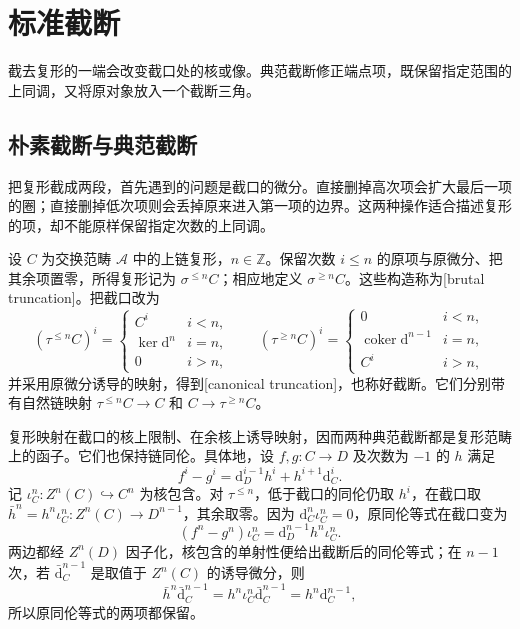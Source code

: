 
\section{标准截断}
\label{b4:sec:1901}

截去复形的一端会改变截口处的核或像。典范截断修正端点项，既保留指定范围的上同调，又将原对象放入一个截断三角。


%
%

\subsection{朴素截断与典范截断}
\label{b4:subsec:1901:01}

把复形截成两段，首先遇到的问题是截口的微分。直接删掉高次项会扩大最后一项的圈；直接删掉低次项则会丢掉原来进入第一项的边界。这两种操作适合描述复形的项，却不能原样保留指定次数的上同调。

\begin{definition}\label{b4:def:standard-truncations}
	设 \(C\) 为交换范畴 \(\mathcal A\) 中的上链复形，\(n\in\mathbb Z\)。保留次数 \(i\le n\) 的原项与原微分、把其余项置零，所得复形记为 \(\sigma^{\le n}C\)；相应地定义 \(\sigma^{\ge n}C\)。这些构造称为[brutal truncation]。把截口改为
	\[
		(\tau^{\le n}C)^i=
		\begin{cases}C^i&i<n,\\ \ker \mathrm{d}^n&i=n,\\0&i>n,\end{cases}
		\qquad (\tau^{\ge n}C)^i=
		\begin{cases}0&i<n,\\ \operatorname{coker}\mathrm{d}^{n-1}&i=n,\\C^i&i>n,\end{cases}
	\]
	并采用原微分诱导的映射，得到[canonical truncation]，也称好截断。它们分别带有自然链映射 \(\tau^{\le n}C\to C\) 和 \(C\to\tau^{\ge n}C\)。
\end{definition}

复形映射在截口的核上限制、在余核上诱导映射，因而两种典范截断都是复形范畴上的函子。它们也保持链同伦。具体地，设 \(f,g:C\to D\) 及次数为 \(-1\) 的 \(h\) 满足
\[
	f^i-g^i=\mathrm d_D^{i-1}h^i+h^{i+1}\mathrm d_C^i.
\]
记 \(\iota_C^n:Z^n(C)\hookrightarrow C^n\) 为核包含。对 \(\tau^{\le n}\)，低于截口的同伦仍取 \(h^i\)，在截口取 \(\bar h^n=h^n\iota_C^n:Z^n(C)\to D^{n-1}\)，其余取零。因为 \(\mathrm d_C^n\iota_C^n=0\)，原同伦等式在截口变为
\[
	(f^n-g^n)\iota_C^n =\mathrm d_D^{n-1}h^n\iota_C^n.
\]
两边都经 \(Z^n(D)\) 因子化，核包含的单射性便给出截断后的同伦等式；在 \(n-1\) 次，若 \(\bar{\mathrm d}_C^{n-1}\) 是取值于 \(Z^n(C)\) 的诱导微分，则
\[
	\bar h^n\bar{\mathrm d}_C^{n-1} =h^n\iota_C^n\bar{\mathrm d}_C^{n-1} =h^n\mathrm d_C^{n-1},
\]
所以原同伦等式的两项都保留。

